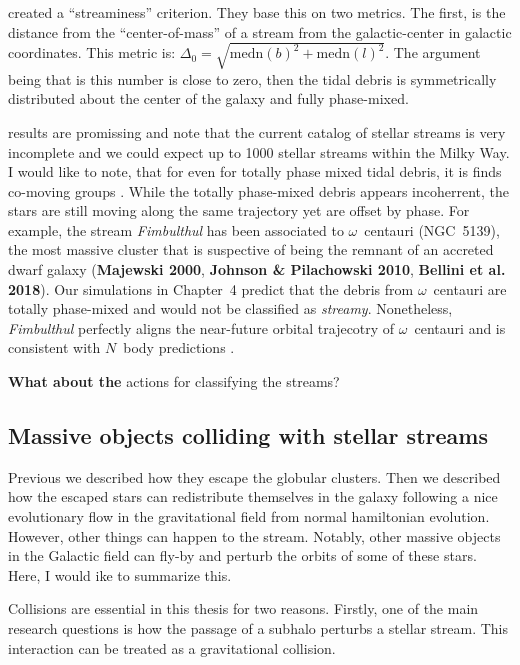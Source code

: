             \citet{2024ApJ...976...54P} created a ``streaminess'' criterion. They base this on two metrics. The first, is the distance from the ``center-of-mass'' of a stream from the galactic-center in galactic coordinates. This metric is:
            $\Delta_0 = \sqrt{\mathrm{medn}(b)^2+\mathrm{medn}(l)^2}$. The argument being that is this number is close to zero, then the tidal debris is symmetrically distributed about the center of the galaxy and fully phase-mixed. 

            \citet{2024ApJ...976...54P} results are promissing and note that the current catalog of stellar streams is very incomplete and we could expect up to 1000 stellar streams within the Milky Way. I would like to note, that for even for totally phase mixed tidal debris, it is finds co-moving groups \citep{2018MNRAS.477.4063M,2018MNRAS.478.3862M}. While the totally phase-mixed debris appears incoherrent, the stars are still moving along the same trajectory yet are offset by phase. For example, the stream \textit{Fimbulthul} has been associated to $\omega$~centauri (NGC~5139), the most massive cluster that is suspective of being the remnant of an accreted dwarf galaxy (\textbf{Majewski 2000}, \textbf{Johnson \& Pilachowski 2010}, \textbf{Bellini et al. 2018}). Our simulations in Chapter~4 predict that the debris from $\omega$~centauri are totally phase-mixed and would not be classified as \textit{streamy}. Nonetheless, \textit{Fimbulthul} perfectly aligns the near-future orbital trajecotry of $\omega$~centauri and is consistent with $N$~body predictions \citep{2021ApJ...914..123I}.

            \textbf{What about the } actions for classifying the streams? 

            
    \subsection{Massive objects colliding with stellar streams}
        Previous we described how they escape the globular clusters. Then we described how the escaped stars can redistribute themselves in the galaxy following a nice evolutionary flow in the gravitational field from normal hamiltonian evolution. However, other things can happen to the stream. Notably, other massive objects in the Galactic field can fly-by and perturb the orbits of some of these stars. Here, I would ike to summarize this. 

        Collisions are essential in this thesis for two reasons. Firstly, one of the main research questions is how the passage of a subhalo perturbs a stellar stream. This interaction can be treated as a gravitational collision.


